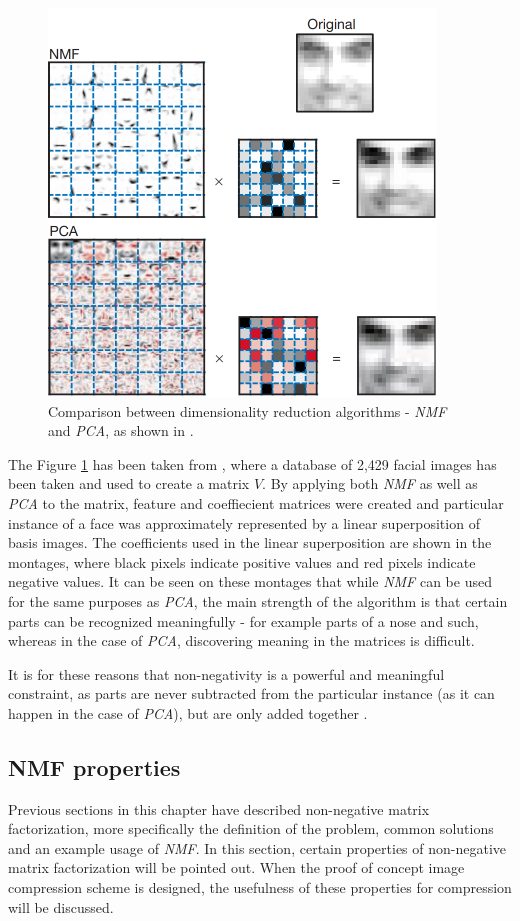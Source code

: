 \documentclass[thesis=M,english]{FITthesis}[2012/10/20]
\begin{document}
\begin{figure}[h]
  \centering
  \includegraphics{imgs/nmfpca-comparison}
  \caption[Comparison between dimensionality reduction algorithms]{Comparison between dimensionality reduction algorithms - \emph{NMF} and \emph{PCA},
           as shown in \cite{lee99}.}
  \label{fig:nmfpca-comparison}
\end{figure}

The Figure \ref{fig:nmfpca-comparison} has been taken from \cite{lee99}, where a database of
2,429 facial images has been taken and used to create a matrix $V$. By
applying both \emph{NMF} as well as \emph{PCA} to the matrix, feature
and coeffiecient matrices were created and particular instance of a
face was approximately represented by a linear superposition of basis
images. The coefficients used in the linear superposition are shown in the
montages, where black pixels indicate positive values and red pixels indicate
negative values. It can be seen on these montages that while \emph{NMF}
can be used for the same purposes as \emph{PCA}, the main strength of the
algorithm is that certain parts can be recognized meaningfully - for example
parts of a nose and such, whereas in the case of \emph{PCA}, discovering
meaning in the matrices is difficult.

It is for these reasons that non-negativity is a powerful and meaningful
constraint, as parts are never subtracted from the particular instance
(as it can happen in the case of \emph{PCA}), but are only added together \cite{nmf-phd-thesis}.


\subsection{NMF properties}
Previous sections in this chapter have described non-negative matrix factorization,
more specifically the definition of the problem, common solutions and an example
usage of \emph{NMF}. In this section, certain properties of non-negative matrix
factorization will be pointed out. When the proof of concept image compression scheme
is designed, the usefulness of these properties for compression will be discussed.
\end{document}
